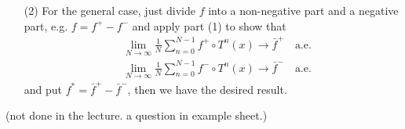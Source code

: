 \documentclass[12pt,a4paper]{report}
\newenvironment{proof}
{\begin{changemargin}{1cm}{0.5cm} 
	}%
	{\end{changemargin}
}
\begin{document}
\begin{proof}
\begin{itemize}
\item[(2)] For the general case, just divide $f$ into a non-negative part and a negative part, e.g. $f=f^+ - f^-$ and apply part (1) to show that
\begin{align*}
& \lim_{N\rightarrow \infty }\frac{1}{N} \sum_{n=0}^{N-1} f^+ \circ T^n (x) \rightarrow \bar{f}^+ \quad \text{a.e.} \\
& \lim_{N\rightarrow \infty }\frac{1}{N} \sum_{n=0}^{N-1} f^- \circ T^n (x) \rightarrow \bar{f}^- \quad \text{a.e.}
\end{align*}
and put $f^* = \bar{f}^+ - \bar{f}^-$, then we have the desired result.
\end{itemize} 

\eop
\end{proof}
\s

\newday

(not done in the lecture. a question in example sheet.)
\end{document}
